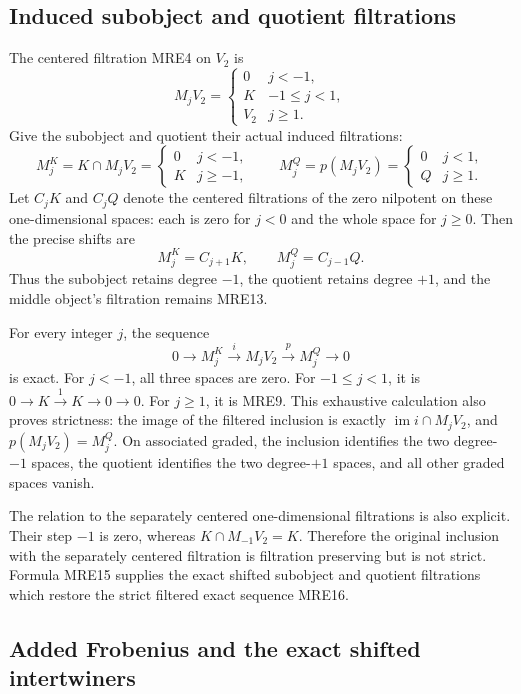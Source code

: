 \documentclass[11pt,a4paper]{article}
\begin{document}
\subsection{Induced subobject and quotient filtrations}

The centered filtration MRE4 on \(V_2\) is
\[
 M_jV_2=
 \begin{cases}
 0&j<-1,\\
 K&-1\leq j<1,\\
 V_2&j\geq1.
 \end{cases}
 \tag{MRE13}
\]
Give the subobject and quotient their actual induced filtrations:
\[
 M_j^K=K\cap M_jV_2=
 \begin{cases}0&j<-1,\\K&j\geq-1,\end{cases}
 \qquad
 M_j^Q=p(M_jV_2)=
 \begin{cases}0&j<1,\\Q&j\geq1.\end{cases}
 \tag{MRE14}
\]
Let \(C_jK\) and \(C_jQ\) denote the centered filtrations of the zero
nilpotent on these one-dimensional spaces: each is zero for \(j<0\)
and the whole space for \(j\geq0\). Then the precise shifts are
\[
 M_j^K=C_{j+1}K,\qquad M_j^Q=C_{j-1}Q.
 \tag{MRE15}
\]
Thus the subobject retains degree \(-1\), the quotient retains degree
\(+1\), and the middle object's filtration remains MRE13.

For every integer \(j\), the sequence
\[
 0\longrightarrow M_j^K\xrightarrow{i}M_jV_2
     \xrightarrow{p}M_j^Q\longrightarrow0
 \tag{MRE16}
\]
is exact. For \(j<-1\), all three spaces are zero. For
\(-1\leq j<1\), it is \(0\to K\xrightarrow{1}K\to0\to0\).
For \(j\geq1\), it is MRE9. This exhaustive calculation also proves
strictness: the image of the filtered inclusion is exactly
\(\operatorname{im}i\cap M_jV_2\), and \(p(M_jV_2)=M_j^Q\).
On associated graded, the inclusion identifies the two degree-\(-1\)
spaces, the quotient identifies the two degree-\(+1\) spaces, and all
other graded spaces vanish.

The relation to the separately centered one-dimensional filtrations is
also explicit. Their step \(-1\) is zero, whereas
\(K\cap M_{-1}V_2=K\). Therefore the original inclusion with the separately
centered filtration is filtration preserving but is not strict. Formula
MRE15 supplies the exact shifted subobject and quotient filtrations
which restore the strict filtered exact sequence MRE16.

\subsection{Added Frobenius and the exact shifted intertwiners}
\end{document}
